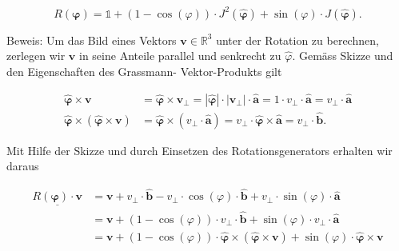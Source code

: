 \documentclass[10pt]{article}
\begin{document}
\begin{equation*}
R(\boldsymbol{\varphi})=\mathbb{1}+(1-\cos (\varphi)) \cdot J^{2}(\hat{\boldsymbol{\varphi}})+\sin (\varphi) \cdot J(\hat{\boldsymbol{\varphi}}) . \tag{6.84}
\end{equation*}


Beweis: Um das Bild eines Vektors $\mathbf{v} \in \mathbb{R}^{3}$ unter der Rotation zu berechnen, zerlegen wir $\mathbf{v}$ in seine Anteile parallel und senkrecht zu $\hat{\varphi}$. Gemäss Skizze und den Eigenschaften des Grassmann- Vektor-Produkts gilt


\begin{align*}
\hat{\boldsymbol{\varphi}} \times \mathbf{v} & =\hat{\boldsymbol{\varphi}} \times \mathbf{v}_{\perp}=|\hat{\boldsymbol{\varphi}}| \cdot\left|\mathbf{v}_{\perp}\right| \cdot \hat{\mathbf{a}}=1 \cdot v_{\perp} \cdot \hat{\mathbf{a}}=v_{\perp} \cdot \hat{\mathbf{a}}  \tag{6.85}\\
\hat{\boldsymbol{\varphi}} \times(\hat{\boldsymbol{\varphi}} \times \mathbf{v}) & =\hat{\boldsymbol{\varphi}} \times\left(v_{\perp} \cdot \hat{\mathbf{a}}\right)=v_{\perp} \cdot \hat{\boldsymbol{\varphi}} \times \hat{\mathbf{a}}=v_{\perp} \cdot \hat{\mathbf{b}} . \tag{6.86}
\end{align*}


Mit Hilfe der Skizze und durch Einsetzen des Rotationsgenerators erhalten wir daraus

$$
\begin{aligned}
\underline{R(\boldsymbol{\varphi}) \cdot \mathbf{v}} & =\mathbf{v}+v_{\perp} \cdot \hat{\mathbf{b}}-v_{\perp} \cdot \cos (\varphi) \cdot \hat{\mathbf{b}}+v_{\perp} \cdot \sin (\varphi) \cdot \hat{\mathbf{a}} \\
& =\mathbf{v}+(1-\cos (\varphi)) \cdot v_{\perp} \cdot \hat{\mathbf{b}}+\sin (\varphi) \cdot v_{\perp} \cdot \hat{\mathbf{a}} \\
& =\mathbf{v}+(1-\cos (\varphi)) \cdot \hat{\boldsymbol{\varphi}} \times(\hat{\boldsymbol{\varphi}} \times \mathbf{v})+\sin (\varphi) \cdot \hat{\boldsymbol{\varphi}} \times \mathbf{v}
\end{aligned}
$$
\end{document}
